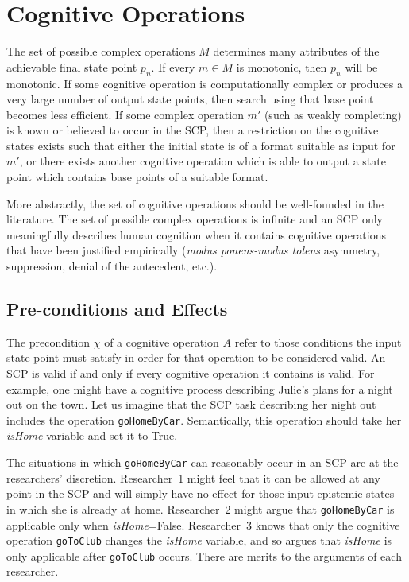 \section{Cognitive Operations}
The set of possible complex operations $M$ determines many attributes of the achievable final state point $p_n$. If every $m \in M$ is monotonic, then $p_n$ will be monotonic. If some cognitive operation is computationally complex or produces a very large number of output state points, then search using that base point becomes less efficient. If some complex operation $m'$ (such as weakly completing) is known or believed to occur in the SCP, then a restriction on the cognitive states exists such that either the initial state is of a format suitable as input for $m'$, or there exists another cognitive operation which is able to output a state point which contains base points of a suitable format.

More abstractly, the set of cognitive operations should be well-founded in the literature. The set of possible complex operations is infinite and an SCP only meaningfully describes human cognition when it contains cognitive operations that have been justified empirically (\textit{modus ponens-modus tolens} asymmetry, suppression, denial of the antecedent, etc.). 

\subsection{Pre-conditions and Effects} \label{ssec:precond}
The precondition $\chi$ of a cognitive operation $A$ refer to those conditions the input state point must satisfy in order for that operation to be considered valid. An SCP is valid if and only if every cognitive operation it contains is valid. For example, one might have a cognitive process describing Julie's plans for a night out on the town. Let us imagine that the SCP task describing her night out includes the operation \texttt{goHomeByCar}. Semantically, this operation should take her \textit{isHome} variable and set it to True.

The situations in which \texttt{goHomeByCar} can reasonably occur in an SCP are at the researchers' discretion. Researcher~1 might feel that it can be allowed at any point in the SCP and will simply have no effect for those input epistemic states in which she is already at home. Researcher~2 might argue that \texttt{goHomeByCar} is applicable only when \textit{isHome}=False. Researcher~3 knows that only the cognitive operation \texttt{goToClub} changes the \textit{isHome} variable, and so argues that \textit{isHome} is only applicable after \texttt{goToClub} occurs. There are merits to the arguments of each researcher.

